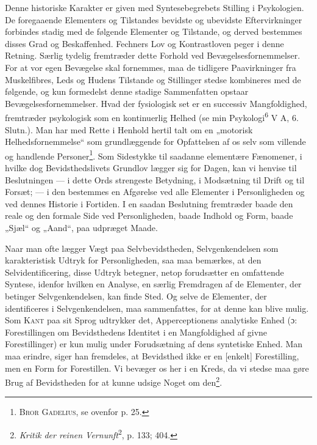 \documentclass[12pt]{article}
\newcommand{\opage}[1]{\marginnote{\footnotesize\textit{[#1]}}}
\begin{document}
Denne historiske Karakter er given med Syntesebegrebets Stilling i Psykologien.
De foregaaende Elementers og Tilstandes bevidste og ubevidste Eftervirkninger
forbindes stadig med de følgende Elementer og Tilstande, og derved bestemmes disses
Grad og Beskaffenhed. Fechners Lov og Kontrastloven peger i denne Retning.
Særlig tydelig fremtræder dette Forhold ved Bevægelsesfornemmelser. For at vor
egen Bevægelse skal fornemmes, maa de tidligere Paavirkninger fra Muskelfibres,
Leds og Hudens Tilstande og Stillinger stedse kombineres med de følgende, og kun
formedelst denne stadige Sammenfatten opstaar Bevægelsesfornemmelser. Hvad der
fysiologisk set er en successiv Mangfoldighed, fremtræder psykologisk som en
kontinuerlig Helhed (se min Psykologi\textsuperscript{6} V A, 6. Slutn.). Man har med Rette i
Henhold hertil talt om en „motorisk Helhedsfornemmelse“ som grundlæggende for
Opfattelsen af os selv som villende og handlende
Personer\footnote{\textsc{Bror Gadelius}, se ovenfor p. 25.}. Som Sidestykke til
saadanne elementære Fænomener, i hvilke dog Bevidsthedslivets Grundlov lægger
sig for Dagen, kan vi henvise til Beslutningen --- i dette Ords strengeste
Betydning, i Modsætning til Drift og til Forsæt; --- i den bestemmes en Afgørelse ved
alle Elementer i Personligheden og ved dennes Historie i Fortiden. I en saadan
Beslutning fremtræder baade den reale og den formale Side ved Personligheden,
baade Indhold og Form, baade „Sjæl“ og „Aand“, paa udpræget Maade.

Naar man ofte lægger Vægt paa Selvbevidstheden, Selvgenkendelsen som
karakteristisk Udtryk for Personligheden, saa maa bemærkes, at den Selvidentificering,
disse Udtryk betegner, netop forudsætter en omfattende Syntese, idenfor hvilken en
\setcounter{footnote}{0}%
\opage{58}Analyse, en særlig Fremdragen af de Elementer, der betinger Selvgenkendelsen, kan
finde Sted. Og selve de Elementer, der identificeres i Selvgenkendelsen, maa
sammenfattes, for at denne kan blive mulig. Som \textsc{Kant} paa sit Sprog udtrykker det,
Apperceptionens analytiske Enhed (ɔ: Forestillingen om Bevidsthedens Identitet i
en Mangfoldighed af givne Forestillinger) er kun mulig under Forudsætning af dens
syntetiske Enhed. Man maa erindre, siger han fremdeles, at Bevidsthed ikke er
en [enkelt] Forestilling, men en Form for Forestillen. Vi bevæger os her i en Kreds,
da vi stedse maa gøre Brug af Bevidstheden for at kunne udsige Noget om
den\footnote{\textit{Kritik der reinen Vernunft}\textsuperscript{2}, p. 133; 404.}.
\end{document}
